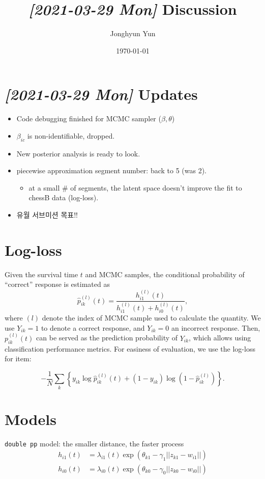 \documentclass[letterpaper,11pt]{article}
\author{Jonghyun Yun}
\date{\today}
\title{\textit{[2021-03-29 Mon] } Discussion}
\begin{document}
\maketitle

\section*{\textit{[2021-03-29 Mon] } Updates}
\label{sec:orgfb91d4a}
\begin{itemize}
\item Code debugging finished for MCMC sampler (\(\beta, \theta\))
\item \(\beta_{ic}\) is non-identifiable, dropped.
\item New posterior analysis is ready to look.
\item piecewise approximation segment number: back to 5 (was 2).
\begin{itemize}
\item at a small \# of segments, the latent space doesn't improve the fit to chessB data (log-loss).
\end{itemize}
\item 유월 서브미션 목표!!
\end{itemize}
\section*{Log-loss}
\label{sec:org04bec69}
Given the survival time \(t\) and MCMC samples, the conditional probability of ``correct'' response is estimated as
\[
\hat p_{ik}^{(l)}(t) = \frac{h_{i1}^{(l)}(t)}{h_{i1}^{(l)}(t) + h_{i0}^{(l)}(t)},
\]
where \((l)\) denote the index of MCMC sample used to calculate the quantity.
We use \(Y_{ik} = 1\) to denote a correct response, and \(Y_{ik} = 0\) an incorrect response. Then, \(p_{ik}^{(l)}(t)\) can be served as the prediction probability of \(Y_{ik}\), which allows using classification performance metrics. For easiness of evaluation, we use the log-loss for item:

\[
-\frac{1}{N}
\sum_{k} \left\{ y_{ik} \log \hat p_{ik}^{(l)}(t) + (1-y_{ik}) \log (1 - \hat p_{ik}^{(l)})\right\}.
\]

\section*{Models}
\label{sec:org88b34bf}
\texttt{double pp} model:
the smaller distance, the faster process
\begin{align*}
h_{i1}(t) &= \lambda_{i1}(t) \exp(\theta_{k1} - \gamma_{1} ||z_{k1} - w_{i1}||) \\
h_{i0}(t) &= \lambda_{i0}(t) \exp(\theta_{k0} - \gamma_{0} ||z_{k0} - w_{i0}||) \\
\end{align*}
\end{document}
